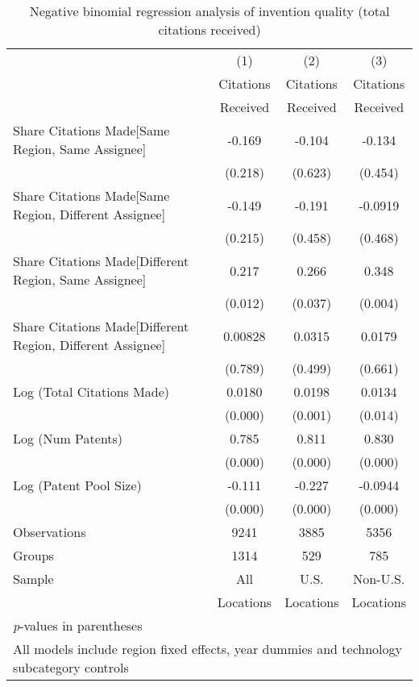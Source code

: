 {
\def\sym#1{\ifmmode^{#1}\else\(^{#1}\)\fi}
\begin{longtable}{l*{3}{c}}
\caption{Negative binomial regression analysis of invention quality (total citations received) \label{model123}}\\
\hline\hline\endfirsthead\hline\endhead\hline\endfoot\endlastfoot
                &\multicolumn{1}{c}{(1)}&\multicolumn{1}{c}{(2)}&\multicolumn{1}{c}{(3)}\\
                &\multicolumn{1}{c}{Citations}&\multicolumn{1}{c}{Citations}&\multicolumn{1}{c}{Citations}\\
                 &\multicolumn{1}{c}{Received}&\multicolumn{1}{c}{Received}&\multicolumn{1}{c}{Received}\\
\hline
Share Citations Made[Same Region, Same Assignee]&   -0.169         &   -0.104         &   -0.134         \\
                &  (0.218)         &  (0.623)         &  (0.454)         \\
Share Citations Made[Same Region, Different Assignee]&   -0.149         &   -0.191         &  -0.0919         \\
                &  (0.215)         &  (0.458)         &  (0.468)         \\
Share Citations Made[Different Region, Same Assignee]&    0.217  &    0.266  &    0.348 \\
                &  (0.012)         &  (0.037)         &  (0.004)         \\
Share Citations Made[Different Region, Different Assignee]&  0.00828         &   0.0315         &   0.0179         \\
                &  (0.789)         &  (0.499)         &  (0.661)         \\
Log (Total Citations Made)&   0.0180&   0.0198&   0.0134  \\
                &  (0.000)         &  (0.001)         &  (0.014)         \\
Log (Num Patents)&    0.785&    0.811&    0.830\\
                &  (0.000)         &  (0.000)         &  (0.000)         \\
Log (Patent Pool Size)&   -0.111&   -0.227&  -0.0944\\
                &  (0.000)         &  (0.000)         &  (0.000)         \\
\hline
Observations&9241&3885&5356         \\
Groups&1314&529&785\\
Sample&All &U.S. &Non-U.S. \\
          &Locations &Locations&Locations \\
\hline\hline
\multicolumn{4}{l}{\small \textit{p}-values in parentheses}\\
\multicolumn{4}{l}{\small All models include region fixed effects, year dummies and technology subcategory controls}\\
\end{longtable}
}

